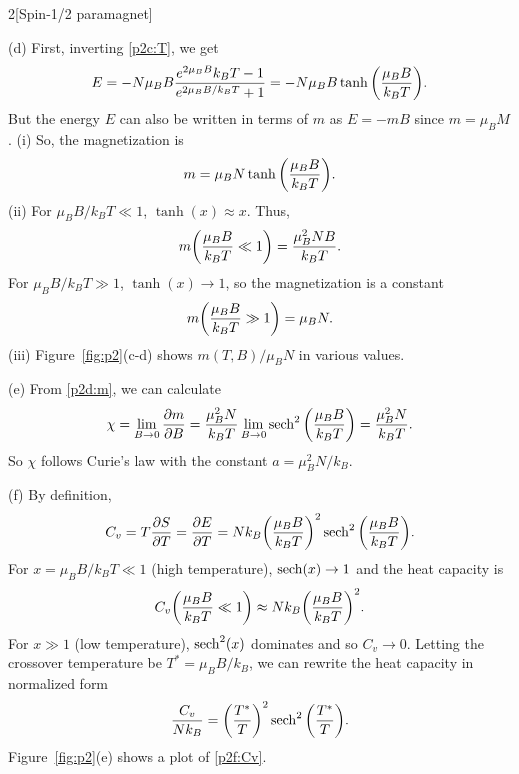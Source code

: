 \documentclass[12pt]{article}
\begin{document}
\begin{problem}{2}[Spin-1/2 paramagnet]
\begin{solution}
(d) First, inverting \eqref{p2c:T}, we get
\begin{equation}
    E=-N\mu_BB\frac{e^{2\mu_BB}{k_BT}-1}{e^{2\mu_BB/k_BT}+1}
    =-N\mu_BB\tanh\qty(\frac{\mu_BB}{k_BT}).
\end{equation}
But the energy $E$ can also be written in terms of $m$ as $E=-mB$ since
$m=\mu_BM$. (i) So, the magnetization is
\begin{equation}\label{p2d:m}
    m=\mu_BN\tanh\qty(\frac{\mu_BB}{k_BT}).
\end{equation}
(ii) For $\mu_BB/k_BT\ll1$, $\tanh(x)\approx x$. Thus,
\begin{equation}
    m\qty(\frac{\mu_BB}{k_BT}\ll 1)=\frac{\mu_B^2NB}{k_BT}.
\end{equation}
For $\mu_BB/k_BT\gg 1$, $\tanh(x)\to1$, so the magnetization is a constant
\begin{equation}
    m\qty(\frac{\mu_BB}{k_BT}\gg1)=\mu_BN .
\end{equation}
(iii) Figure~\ref{fig:p2}(c-d) shows $m(T,B)/\mu_BN$ in various values.

(e) From \eqref{p2d:m}, we can calculate
\begin{equation}
    \chi=\lim_{B\to0}\frac{\partial m}{\partial B}
    =\frac{\mu_B^2N}{k_BT}\lim_{B\to0}\sech^2\qty(\frac{\mu_BB}{k_BT})
    =\frac{\mu_B^2N}{k_BT}.
\end{equation}
So $\chi$ follows Curie's law with the constant $a=\mu_B^2N/k_B$.

(f) By definition,
\begin{equation}
    C_v=T\frac{\partial S}{\partial T}
    =\frac{\partial E}{\partial T}
    =Nk_B\qty(\frac{\mu_BB}{k_BT})^2\sech^2\qty(\frac{\mu_BB}{k_BT}).
\end{equation}
For $x=\mu_BB/k_BT\ll 1$ (high temperature), $\sech(x)\to 1$ and the heat
capacity is
\begin{equation}
    C_v\qty(\frac{\mu_BB}{k_BT}\ll1)\approx Nk_B\qty(\frac{\mu_BB}{k_BT})^2.
\end{equation}
For $x\gg 1$ (low temperature), $\sech^2(x)$ dominates and so $C_v\to0$. Letting
the crossover temperature be $T^\ast=\mu_BB/k_B$, we can rewrite the heat
capacity in normalized form
\begin{equation}\label{p2f:Cv}
    \frac{C_v}{Nk_B}=\qty(\frac{T^\ast}{T})^2\sech^2\qty(\frac{T^\ast}{T}).
\end{equation}
Figure~\ref{fig:p2}(e) shows a plot of \eqref{p2f:Cv}.
\end{solution}
\end{problem}
\end{document}
